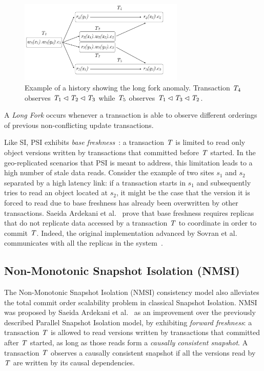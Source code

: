 \begin{figure}[h]
  \centering
  \includegraphics[width=0.7\textwidth]{figures/long_fork_hist.pdf}
  \caption{Example of a history showing the long fork anomaly. Transaction $\mathit{T}_4$ observes $\mathit{T}_1 \lhd \mathit{T}_2 \lhd \mathit{T}_3$ while $\mathit{T}_5$ observes $\mathit{T}_1 \lhd \mathit{T}_3 \lhd \mathit{T}_2$.}
  \label{fig:long_fork_history}
\end{figure}

\begin{definition}
A \emph{Long Fork} occurs whenever a transaction is able to observe different orderings of previous non-conflicting update transactions.
\end{definition}

Like SI, PSI exhibits \emph{base freshness}~\citep{ardekani_freshness}: a transaction $\mathit{T}$ is limited to read only object versions written by transactions that committed before $\mathit{T}$ started. In the geo-replicated scenarios that PSI is meant to address, this limitation leads to a high number of stale data reads. Consider the example of two sites $s_1$ and $s_2$ separated by a high latency link: if a transaction starts in $s_1$ and subsequently tries to read an object located at $s_2$, it might be the case that the version it is forced to read due to base freshness has already been overwritten by other transactions. Saeida Ardekani et al.~\citep[Theorem 4]{ardekani_si_limits} prove that base freshness requires replicas that do not replicate data accessed by a transaction $\mathit{T}$ to coordinate in order to commit $\mathit{T}$. Indeed, the original implementation advanced by Sovran et al. communicates with all the replicas in the system~\citep{psi-intro}.

\subsection{Non-Monotonic Snapshot Isolation (NMSI)}
\label{sect:nmsi}

The Non-Monotonic Snapshot Isolation (NMSI) consistency model also alleviates the total commit order scalability problem in classical Snapshot Isolation. NMSI was proposed by Saeida Ardekani et al.~\citep{ardekani_nmsi} as an improvement over the previously described Parallel Snapshot Isolation model, by exhibiting \emph{forward freshness}: a transaction $\mathit{T}$ is allowed to read versions written by transactions that committed after $\mathit{T}$ started, as long as those reads form a \emph{causally consistent snapshot}. A transaction $\mathit{T}$ observes a causally consistent snapshot if all the versions read by $\mathit{T}$ are written by its causal dependencies.

